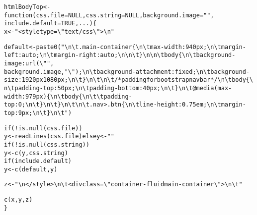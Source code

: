 \documentclass{article}\usepackage[]{graphicx}\usepackage[]{color}
\makeatletter
\newcommand{\hlnum}[1]{\textcolor[rgb]{0.863,0.196,0.184}{#1}}%
\newcommand{\hlstr}[1]{\textcolor[rgb]{0.863,0.196,0.184}{#1}}%
\newcommand{\hlopt}[1]{\textcolor[rgb]{0.576,0.631,0.631}{#1}}%
\newcommand{\hlstd}[1]{\textcolor[rgb]{0.514,0.58,0.588}{#1}}%
\newcommand{\hlkwa}[1]{\textcolor[rgb]{0.796,0.294,0.086}{#1}}%
\newcommand{\hlkwb}[1]{\textcolor[rgb]{0.522,0.6,0}{#1}}%
\newcommand{\hlkwc}[1]{\textcolor[rgb]{0.796,0.294,0.086}{#1}}%
\newcommand{\hlkwd}[1]{\textcolor[rgb]{0.576,0.631,0.631}{#1}}%
\newenvironment{kframe}{%
 \def\at@end@of@kframe{}%
 \ifinner\ifhmode%
  \def\at@end@of@kframe{\end{minipage}}%
  \begin{minipage}{\columnwidth}%
 \fi\fi%
 \def\FrameCommand##1{\hskip\@totalleftmargin \hskip-\fboxsep
 \colorbox{shadecolor}{##1}\hskip-\fboxsep
     \hskip-\linewidth \hskip-\@totalleftmargin \hskip\columnwidth}%
 \MakeFramed {\advance\hsize-\width
   \@totalleftmargin\z@ \linewidth\hsize
   \@setminipage}}%
 {\par\unskip\endMakeFramed%
 \at@end@of@kframe}
\newenvironment{knitrout}{}{} %
\makeatother
\begin{document}
\begin{knitrout}
\color{fgcolor}\begin{kframe}
\begin{alltt}
\hlstd{htmlBodyTop} \hlkwb{<-} \hlkwa{function}\hlstd{(}\hlkwc{css.file} \hlstd{=} \hlkwa{NULL}\hlstd{,} \hlkwc{css.string} \hlstd{=} \hlkwa{NULL}\hlstd{,} \hlkwc{background.image} \hlstd{=} \hlstr{""}\hlstd{,}
    \hlkwc{include.default} \hlstd{=} \hlnum{TRUE}\hlstd{,} \hlkwc{...}\hlstd{) \{}
    \hlstd{x} \hlkwb{<-} \hlstr{"<style type = \textbackslash{}"text/css\textbackslash{}">\textbackslash{}n"}

    \hlstd{default} \hlkwb{<-} \hlkwd{paste0}\hlstd{(}\hlstr{"\textbackslash{}n\textbackslash{}t.main-container \{\textbackslash{}n\textbackslash{}t  max-width: 940px;\textbackslash{}n\textbackslash{}t  margin-left: auto;\textbackslash{}n\textbackslash{}t  margin-right: auto;\textbackslash{}n\textbackslash{}n\textbackslash{}t\}\textbackslash{}n\textbackslash{}n\textbackslash{}tbody \{\textbackslash{}n\textbackslash{}t  background-image: url(\textbackslash{}""}\hlstd{,}
        \hlstd{background.image,} \hlstr{"\textbackslash{}");\textbackslash{}n\textbackslash{}t  background-attachment: fixed;\textbackslash{}n\textbackslash{}t  background-size: 1920px 1080px;\textbackslash{}n\textbackslash{}t\}\textbackslash{}n\textbackslash{}t\textbackslash{}n\textbackslash{}t/* padding for bootstrap navbar */\textbackslash{}n\textbackslash{}tbody \{\textbackslash{}n\textbackslash{}t  padding-top: 50px;\textbackslash{}n\textbackslash{}t  padding-bottom: 40px;\textbackslash{}n\textbackslash{}t\}\textbackslash{}n\textbackslash{}t@media (max-width: 979px) \{\textbackslash{}n\textbackslash{}t  body \{\textbackslash{}n\textbackslash{}t\textbackslash{}tpadding-top: 0;\textbackslash{}n\textbackslash{}t  \}\textbackslash{}n\textbackslash{}t\}\textbackslash{}n\textbackslash{}t\textbackslash{}n\textbackslash{}t.nav>.btn \{\textbackslash{}n\textbackslash{}t  line-height: 0.75em;\textbackslash{}n\textbackslash{}t  margin-top: 9px;\textbackslash{}n\textbackslash{}t\}\textbackslash{}n\textbackslash{}t"}\hlstd{)}

    \hlkwa{if} \hlstd{(}\hlopt{!}\hlkwd{is.null}\hlstd{(css.file))}
        \hlstd{y} \hlkwb{<-} \hlkwd{readLines}\hlstd{(css.file)} \hlkwa{else} \hlstd{y} \hlkwb{<-} \hlstr{""}
    \hlkwa{if} \hlstd{(}\hlopt{!}\hlkwd{is.null}\hlstd{(css.string))}
        \hlstd{y} \hlkwb{<-} \hlkwd{c}\hlstd{(y, css.string)}
    \hlkwa{if} \hlstd{(include.default)}
        \hlstd{y} \hlkwb{<-} \hlkwd{c}\hlstd{(default, y)}

    \hlstd{z} \hlkwb{<-} \hlstr{"\textbackslash{}n</style>\textbackslash{}n\textbackslash{}t<div class=\textbackslash{}"container-fluid main-container\textbackslash{}">\textbackslash{}n\textbackslash{}t"}

    \hlkwd{c}\hlstd{(x, y, z)}
\hlstd{\}}
\end{alltt}
\end{kframe}
\end{knitrout}
\end{document}
